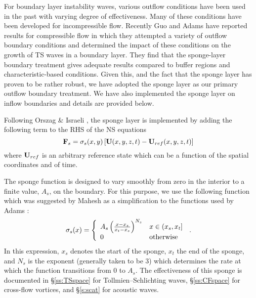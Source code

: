For boundary layer instability waves, various outflow conditions have been
used in the past with varying degree of effectiveness.  Many of these
conditions have been developed for incompressible flow.  Recently Guo and
Adams \cite{GuAd:93} have reported results for compressible flow in which they
attempted a variety of outflow boundary conditions and determined the impact of
these conditions on the growth of TS waves in a boundary layer.  They find
that the sponge-layer boundary treatment gives adequate results compared to
buffer regions and characteristic-based conditions.  Given this, and the fact
that the sponge layer has proven to be rather robust, we have adopted the
sponge layer as our primary outflow boundary treatment.  We have also
implemented the sponge layer on inflow boundaries and details are provided
below.

Following Orszag \& Israeli \cite{IsOr:81}, the sponge layer is implemented by
adding the following term to the RHS of the NS equations
%
\begin{equation} \label{e:sponge}
  {\bf F}_s = \sigma_s(x,y) \left[ {\bf U}(x,y,z,t) - {\bf U}_{ref}(x,y,z,t) \right]
\end{equation}
%
where ${\bf U}_{ref}$ is an arbitrary reference state which can be a function of
the spatial coordinates and of time.

The sponge function is designed to vary smoothly from zero in the interior to
a finite value, $A_s$, on the boundary.  For this purpose, we use the
following function which was suggested by Mahesh \cite{Mahesh:96} as a
simplification to the functions used by Adams \cite{Adams:94}:
%
\begin{equation} \label{e:spgfun}
  \sigma_s(x) = \left\{ \begin{array}{ll}
                A_s \left( {{x - x_s}\over{x_t - x_s}} \right )^{N_s} & 
                x \in (x_s,x_t] \\
	        0 & \mbox{otherwise}
	        \end{array}
	        \right. \label{spgfun} {\, .}
\end{equation}
%
In this expression, $x_s$ denotes the start of the sponge, $x_t$ the end of
the sponge, and $N_s$ is the exponent (generally taken to be 3) which
determines the rate at which the function transitions from 0 to $A_s$.  The
effectiveness of this sponge is documented in \S\ref{ss:TSspace} for
Tollmien--Schlichting waves, \S\ref{ss:CFspace} for cross-flow vortices, and
\S\ref{s:scat} for acoustic waves.


